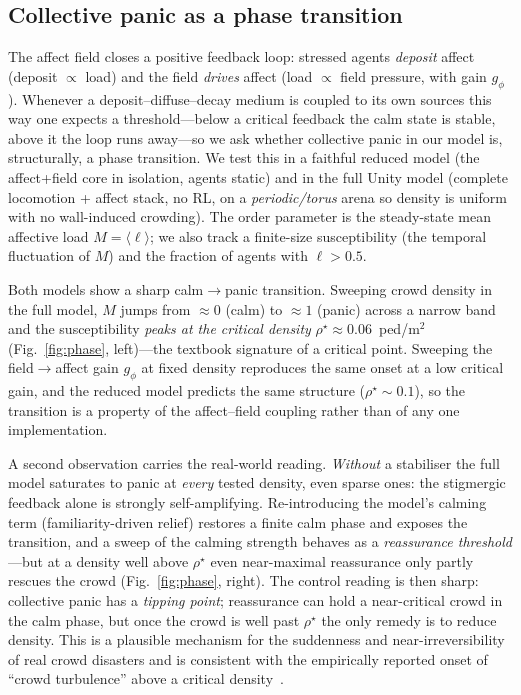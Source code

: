 \documentclass[sigconf,nonacm]{acmart}
\begin{document}
\subsection{Collective panic as a phase transition}
\label{sec:phase}
The affect field closes a positive feedback loop: stressed agents \emph{deposit} affect (deposit
$\propto$ load) and the field \emph{drives} affect (load $\propto$ field pressure, with gain $g_\phi$).
Whenever a deposit--diffuse--decay medium is coupled to its own sources this way one expects a
threshold---below a critical feedback the calm state is stable, above it the loop runs away---so we
ask whether collective panic in our model is, structurally, a phase transition. We test this in a
faithful reduced model (the affect+field core in isolation, agents static) and in the full Unity model
(complete locomotion + affect stack, no RL, on a \emph{periodic/torus} arena so density is uniform with
no wall-induced crowding). The order parameter is the steady-state mean affective load
$M=\langle\ell\rangle$; we also track a finite-size susceptibility (the temporal fluctuation of $M$) and
the fraction of agents with $\ell>0.5$.

Both models show a sharp calm$\to$panic transition. Sweeping crowd density in the full model, $M$ jumps
from $\approx0$ (calm) to $\approx1$ (panic) across a narrow band and the susceptibility \emph{peaks at
the critical density} $\rho^\star\approx0.06$~ped/m$^2$ (Fig.~\ref{fig:phase}, left)---the textbook
signature of a critical point. Sweeping the field$\to$affect gain $g_\phi$ at fixed density reproduces
the same onset at a low critical gain, and the reduced model predicts the same structure
($\rho^\star\!\sim\!0.1$), so the transition is a property of the affect--field coupling rather than of
any one implementation.

A second observation carries the real-world reading. \emph{Without} a stabiliser the full model
saturates to panic at \emph{every} tested density, even sparse ones: the stigmergic feedback alone is
strongly self-amplifying. Re-introducing the model's calming term (familiarity-driven relief) restores
a finite calm phase and exposes the transition, and a sweep of the calming strength behaves as a
\emph{reassurance threshold}---but at a density well above $\rho^\star$ even near-maximal reassurance
only partly rescues the crowd (Fig.~\ref{fig:phase}, right). The control reading is then sharp:
collective panic has a \emph{tipping point}; reassurance can hold a near-critical crowd in the calm
phase, but once the crowd is well past $\rho^\star$ the only remedy is to reduce density. This is a
plausible mechanism for the suddenness and near-irreversibility of real crowd disasters and is
consistent with the empirically reported onset of ``crowd turbulence'' above a critical
density~\cite{helbing2007turbulence}.
\end{document}
